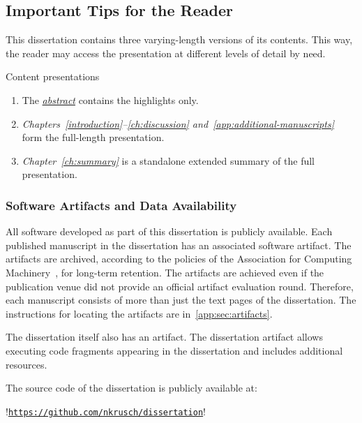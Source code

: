\subsection{Important Tips for the Reader}
\label{subsec:tips}

This dissertation contains three varying-length versions of its contents.
This way, the reader may access the presentation at different levels of detail by need.

\begin{infobox}[]{Content presentations}
\begin{enumerate}[wide, labelwidth=!, labelindent=0pt]
\item The \emph{\hyperref[abs]{abstract}} contains the highlights only.
\item \emph{Chapters~\ref{introduction}--\ref{ch:discussion}
and~\ref{app:additional-manuscripts}} form the full-length presentation.
\item \emph{Chapter~\ref{ch:summary}} is a standalone extended summary of the
full presentation.
\end{enumerate}
\end{infobox}

\subsubsection{Software Artifacts and Data Availability}

All software developed as part of this dissertation is publicly available. Each
published manuscript in the dissertation has an associated software artifact.
The artifacts are archived, according to the policies of the Association for
Computing Machinery~\cite{acm_badging}, for long-term retention. The artifacts
are achieved even if the publication venue did not provide an official artifact
evaluation round. Therefore, each manuscript consists of more than just the text
pages of the dissertation. The instructions for locating the artifacts are
in~\autoref{app:sec:artifacts}.

The dissertation itself also has an artifact. The dissertation artifact allows
executing code fragments appearing in the dissertation and includes additional
resources.

The source code of the dissertation is publicly available at:

\begin{center}
\begin{minipage}{\textwidth}
\begin{browserlisting}[nolol,escapeinside=!!]
!\href{https://github.com/nkrusch/dissertation}{\texttt{https://github.com/nkrusch/dissertation}}!
\end{browserlisting}
\end{minipage}
\end{center}

